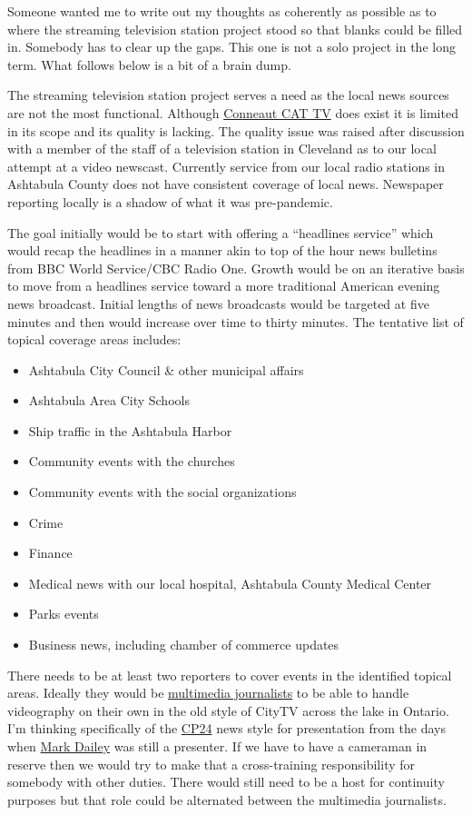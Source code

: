 Someone wanted me to write out my thoughts as coherently as possible as
to where the streaming television station project stood so that blanks
could be filled in. Somebody has to clear up the gaps. This one is not a
solo project in the long term. What follows below is a bit of a brain
dump.

The streaming television station project serves a need as the local news
sources are not the most functional. Although
\href{https://vimeo.com/user126359532}{Conneaut CAT TV} does exist it is
limited in its scope and its quality is lacking. The quality issue was
raised after discussion with a member of the staff of a television
station in Cleveland as to our local attempt at a video newscast.
Currently service from our local radio stations in Ashtabula County does
not have consistent coverage of local news. Newspaper reporting locally
is a shadow of what it was pre-pandemic.

The goal initially would be to start with offering a ``headlines
service'' which would recap the headlines in a manner akin to top of the
hour news bulletins from BBC World Service/CBC Radio One. Growth would
be on an iterative basis to move from a headlines service toward a more
traditional American evening news broadcast. Initial lengths of news
broadcasts would be targeted at five minutes and then would increase
over time to thirty minutes. The tentative list of topical coverage
areas includes:

\begin{itemize}
\tightlist
\item
  Ashtabula City Council \& other municipal affairs
\item
  Ashtabula Area City Schools
\item
  Ship traffic in the Ashtabula Harbor
\item
  Community events with the churches
\item
  Community events with the social organizations
\item
  Crime
\item
  Finance
\item
  Medical news with our local hospital, Ashtabula County Medical Center
\item
  Parks events
\item
  Business news, including chamber of commerce updates
\end{itemize}

There needs to be at least two reporters to cover events in the
identified topical areas. Ideally they would be
\href{https://en.wikipedia.org/w/index.php?title=Multimedia_journalism&oldid=1131239568}{multimedia
journalists} to be able to handle videography on their own in the old
style of CityTV across the lake in Ontario. I'm thinking specifically of
the
\href{https://en.wikipedia.org/w/index.php?title=CP24&oldid=1138757831}{CP24}
news style for presentation from the days when
\href{https://en.wikipedia.org/w/index.php?title=Mark_Dailey&oldid=1124036072}{Mark
Dailey} was still a presenter. If we have to have a cameraman in reserve
then we would try to make that a cross-training responsibility for
somebody with other duties. There would still need to be a host for
continuity purposes but that role could be alternated between the
multimedia journalists.

